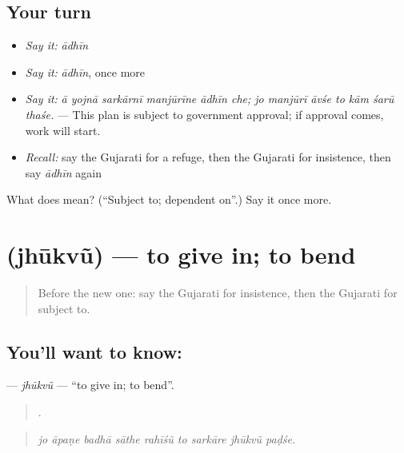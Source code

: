 \subsection*{Your turn}
\begin{itemize}
\raggedright
  \item \emph{Say it:} \emph{ādhīn}
  \item \emph{Say it:} \emph{ādhīn}, once more
  \item \emph{Say it:} \emph{ā yojnā sarkārnī manjūrīne ādhīn che; jo manjūrī āvśe to kām śarū thaśe.} — This plan is subject to government approval; if approval comes, work will start.
  \item \emph{Recall:} say the Gujarati for a refuge, then the Gujarati for insistence, then say \emph{ādhīn} again
\end{itemize}

\begin{tcolorbox}[breakable,colback=teal!4,colframe=teal!35!black,title={Before you move on}]
What does  mean? (\textquotedblleft{}Subject to; dependent on\textquotedblright{}.) Say it once more.
\end{tcolorbox}
\section[\texorpdfstring{\gu{ઝૂકવું} (jhūkvũ)}{ઝૂકવું (jhūkvũ)}]{ (jhūkvũ) — to give in; to bend}

\label{lesson:GU-C386-jhukvu}



\begin{quote}
Before the new one: say the Gujarati for insistence, then the Gujarati for subject to.
\end{quote}

\subsection*{You'll want to know: }
\textbf{} — \emph{jhūkvũ} — \textquotedblleft{}to give in; to bend\textquotedblright{}.

\begin{quote}
        .
\end{quote}

\begin{quote}
\emph{jo āpaṇe badhā sāthe rahīśũ to sarkāre jhūkvũ paḍśe.}
\end{quote}

